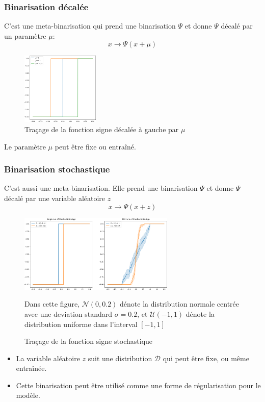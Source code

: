 \subsubsection{Binarisation décalée}
C'est une meta-binarisation qui prend une binarisation $\Psi$ et donne $\Psi$ décalé par un paramètre $\mu:$
\begin{equation}
	x\rightarrow \Psi(x+\mu)
\end{equation}
\begin{figure}[htp]
	\centering
	\includegraphics[width=0.33\textwidth]{Figures/shifted-sign-cropped.png}
	\caption{Traçage de la fonction signe décalée à gauche par $\mu$}
	\label{fig:ShiftedSign}
\end{figure}
\FloatBarrier
Le paramètre $\mu$ peut être fixe ou entraîné.
\subsubsection{Binarisation stochastique}
C'est aussi une meta-binarisation. Elle prend une binarisation $\Psi$ et donne $\Psi$ décalé par une variable aléatoire $z$
\begin{equation}
	x\rightarrow \Psi(x+z)
\end{equation}
\begin{figure}[htp]
	\centering
	\includegraphics[width=0.66\textwidth]{Figures/stochastic-sign-cropped.png}
	\caption{Traçage de la fonction signe stochastique}
	\footnotesize
	Dans cette figure, $\mathcal{N}(0,0.2)$ dénote la distribution normale centrée avec une deviation standard $\sigma=0.2$, et $\mathcal{U}(-1,1)$ dénote la distribution uniforme dans l'interval $[-1,1]$
	\label{fig:StochasticSign}
\end{figure}
\FloatBarrier
\begin{itemize}
	
	\item La variable aléatoire $z$ suit une distribution $\mathcal{D}$ qui peut être fixe, ou même entraînée.  
	\item Cette binarisation peut être utilisé comme une forme de régularisation pour le modèle.
\end{itemize}

